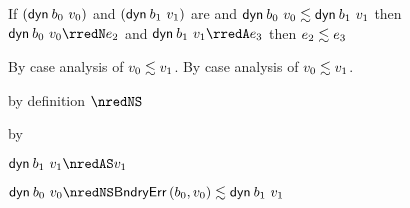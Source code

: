 \begin{lemma}\label{H-dyn-A-dyn}
  If\/ ${(\mathsf{dyn}^{}\,b_0~v_0)}$
  and\/ $(\mathsf{dyn}^{}\,b_1~v_1)$ are \reducedsurfaceexpressions{}
  and\/ $\mathsf{dyn}^{}\,b_0~v_0 \lesssim \mathsf{dyn}^{}\,b_1~v_1$
  then\/ ${\edynb{\sbnd_0}{\svalue_0}} \rredN \sexpr_2$
  and\/ ${\edynb{\sbnd_1}{\svalue_1}} \rredA \sexpr_3$
  then\/ $e_2 \lesssim e_3$
\end{lemma}{
  \newcommand{\shortpf}{By case analysis of $\rexpr{\svalue_0}{\svalue_1}$.}
\begin{lamportproof*}
  \shortpf
\mainproof
  \shortpf

    \begin{pfproof}
        \begin{pfproof}
            \begin{pfproof}
              by definition $\nredNS$
            \end{pfproof}
            \begin{pfproof}
              by 
            \end{pfproof}
          \qedstep
            \begin{pfproof}
              $\edynb{\sbnd_1}{\svalue_1} \nredAS \svalue_1$
            \end{pfproof}
        \end{pfproof}
        \begin{pfproof}
          \qedstep
            \begin{pfproof}
              $\edynb{\sbnd_0}{\svalue_0} \nredNS \rexpr{\boundaryerror{\sbnd_0}{\svalue_0}}{\edynb{\sbnd_1}{\svalue_1}}$
            \end{pfproof}
        \end{pfproof}
    \end{pfproof}


\end{lamportproof*}}
